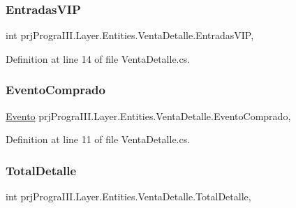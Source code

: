 \subsubsection{\texorpdfstring{Entradas\+V\+IP}{EntradasVIP}}
{\footnotesize\ttfamily int prj\+Progra\+I\+I\+I.\+Layer.\+Entities.\+Venta\+Detalle.\+Entradas\+V\+IP\hspace{0.3cm}{\ttfamily [get]}, {\ttfamily [set]}}



Definition at line 14 of file Venta\+Detalle.\+cs.

\hypertarget{classprj_progra_i_i_i_1_1_layer_1_1_entities_1_1_venta_detalle_addeb3e0d30510828f3756f8c3b034073}{}\label{classprj_progra_i_i_i_1_1_layer_1_1_entities_1_1_venta_detalle_addeb3e0d30510828f3756f8c3b034073} 
\subsubsection{\texorpdfstring{Evento\+Comprado}{EventoComprado}}
{\footnotesize\ttfamily \hyperlink{classprj_progra_i_i_i_1_1_layer_1_1_entities_1_1_evento}{Evento} prj\+Progra\+I\+I\+I.\+Layer.\+Entities.\+Venta\+Detalle.\+Evento\+Comprado\hspace{0.3cm}{\ttfamily [get]}, {\ttfamily [set]}}



Definition at line 11 of file Venta\+Detalle.\+cs.

\hypertarget{classprj_progra_i_i_i_1_1_layer_1_1_entities_1_1_venta_detalle_a08d36cbbedd9f17355a2ebca10a4db0a}{}\label{classprj_progra_i_i_i_1_1_layer_1_1_entities_1_1_venta_detalle_a08d36cbbedd9f17355a2ebca10a4db0a} 
\subsubsection{\texorpdfstring{Total\+Detalle}{TotalDetalle}}
{\footnotesize\ttfamily int prj\+Progra\+I\+I\+I.\+Layer.\+Entities.\+Venta\+Detalle.\+Total\+Detalle\hspace{0.3cm}{\ttfamily [get]}, {\ttfamily [set]}}



